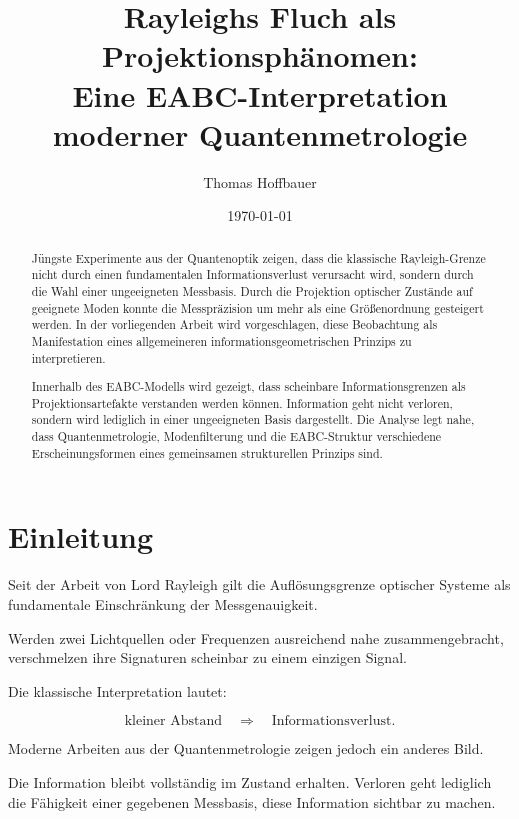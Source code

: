 \documentclass[11pt,a4paper]{article}
\title{
	Rayleighs Fluch als Projektionsphänomen:\\
	Eine EABC-Interpretation moderner Quantenmetrologie
}
\author{
	Thomas Hoffbauer
}
\date{\today}
\theoremstyle{remark}
\begin{document}
	
	\maketitle
	
	\begin{abstract}
		
		Jüngste Experimente aus der Quantenoptik zeigen, dass die klassische
		Rayleigh-Grenze nicht durch einen fundamentalen Informationsverlust
		verursacht wird, sondern durch die Wahl einer ungeeigneten Messbasis.
		Durch die Projektion optischer Zustände auf geeignete Moden konnte die
		Messpräzision um mehr als eine Größenordnung gesteigert werden.
		In der vorliegenden Arbeit wird vorgeschlagen, diese Beobachtung als
		Manifestation eines allgemeineren informationsgeometrischen Prinzips zu
		interpretieren.
		
		Innerhalb des EABC-Modells wird gezeigt, dass scheinbare
		Informationsgrenzen als Projektionsartefakte verstanden werden können.
		Information geht nicht verloren, sondern wird lediglich in einer
		ungeeigneten Basis dargestellt.
		Die Analyse legt nahe, dass Quantenmetrologie, Modenfilterung und die
		EABC-Struktur verschiedene Erscheinungsformen eines gemeinsamen
		strukturellen Prinzips sind.
		
	\end{abstract}
	
	\section{Einleitung}
	
	Seit der Arbeit von Lord Rayleigh gilt die Auflösungsgrenze optischer
	Systeme als fundamentale Einschränkung der Messgenauigkeit.
	
	Werden zwei Lichtquellen oder Frequenzen ausreichend nahe
	zusammengebracht, verschmelzen ihre Signaturen scheinbar zu einem
	einzigen Signal.
	
	Die klassische Interpretation lautet:
	
	\begin{equation}
		\text{kleiner Abstand}
		\quad\Longrightarrow\quad
		\text{Informationsverlust}.
	\end{equation}
	
	Moderne Arbeiten aus der Quantenmetrologie zeigen jedoch ein anderes
	Bild.
	
	Die Information bleibt vollständig im Zustand erhalten.
	Verloren geht lediglich die Fähigkeit einer gegebenen Messbasis,
	diese Information sichtbar zu machen.
	
\end{document}
